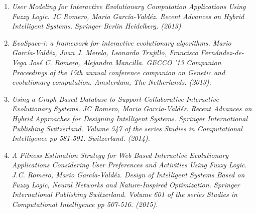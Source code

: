 
\begin{enumerate}
\item \textit{User Modeling for Interactive Evolutionary Computation
Applications Using Fuzzy Logic. JC Romero, Mario Garc\'ia-Vald\'ez.
 Recent Advances on Hybrid Intelligent Systems. Springer Berlin Heidelberg. (2013)}
\item \textit{ EvoSpace-i: a framework for interactive evolutionary algorithms.
Mario Garc\'ia-Vald\'ez, 	Juan J. Merelo, 	Leonardo Trujillo, 	Francisco
Fernández-de-Vega Jos\'e C. Romero, 	Alejandra Mancilla. GECCO '13 Companion
Proceedings of the 15th annual conference  companion on Genetic and evolutionary
computation. Amsterdam, The Netherlands. (2013).}
\item \textit{Using a Graph Based Database to Support Collaborative Interactive
Evolutionary Systems.  JC Romero, Mario Garc\'ia-Vald\'ez. Recent Advances on
Hybrid Approaches for Designing Intelligent Systems. Springer International
Publishing Switzerland. Volume 547 of the series Studies in Computational
Intelligence pp 581-591. Switzerland. (2014).}
\item \textit{A Fitness Estimation Strategy for Web Based Interactive Evolutionary
Applications Considering User Preferences and Activities Using Fuzzy Logic. J.C.
Romero, Mario Garc\'ia-Vald\'ez. Design of Intelligent Systems Based on Fuzzy
Logic, Neural Networks and Nature-Inspired Optimization. Springer International
Publishing Switzerland. Volume 601 of the series Studies in Computational
Intelligence pp 507-516. (2015).}
\end{enumerate}
